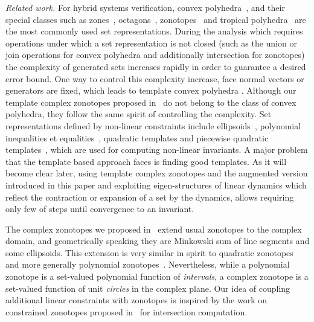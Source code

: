 

\emph{Related work.} For hybrid systems verification, convex polyhedra~\cite{CousotHalbwachs78,jeannet2009apron}, and their special classes such as
zones~\cite{DBLP:conf/pado/Mine01},
octagons~\cite{DBLP:journals/lisp/Mine06}, zonotopes~\cite{DBLP:conf/hybrid/Girard05,DBLP:conf/eucc/MaigaCRT14} and
tropical polyhedra~\cite{DBLP:conf/sas/AllamigeonGG08} are the most
commonly used set representations. During the analysis which requires
operations under which a set representation is not closed (such as the
union or join operations for convex polyhedra and additionally
intersection for zonotopes) the complexity of generated sets increases
rapidly in order to guarantee a desired error bound. One way to
control this complexity increase, face normal vectors or generators
are fixed, which leads to template convex
polyhedra \cite{Sankaranarayanan+Dang+Ivancic-08-Symbolic,DBLP:conf/aplas/DangG11}. Although
our template complex zonotopes proposed in~\cite{tcz2017} do not
belong to the class of convex polyhedra, they follow the same
spirit of controlling the complexity. Set representations defined by non-linear constraints include
ellipsoids~\cite{Kurzhanski2000201}, polynomial
inequalities\cite{DBLP:conf/sas/BagnaraRZ05} et
equalities~\cite{Rodriguez-Carbonell:2007}, quadratic templates and
piecewise quadratic
templates~\cite{DBLP:conf/esop/AdjeGG10,DBLP:conf/hybrid/RouxJGF12,DBLP:conf/fm/RouxG14,DBLP:conf/hybrid/Adje17},
which are used for computing non-linear invariants. A major problem
that the template based approach faces is finding good templates. As
it will become clear later, using template complex zonotopes and the
augmented version introduced in this paper and exploiting
eigen-structures of linear dynamics which reflect the contraction or
expansion of a set by the dynamics, allows requiring only few of steps
until convergence to an invariant.

The complex zonotopes we proposed in~\cite{adimoolamACC2016} extend usual zonotopes to the complex domain, and geometrically speaking they are Minkowski sum of line segments and some ellipsoids. This extension is very similar in spirit to quadratic zonotopes~\cite{DBLP:conf/aplas/AdjeGW15} and more generally polynomial zonotopes~\cite{DBLP:conf/hybrid/Althoff13}. Nevertheless, while a polynomial zonotope is a set-valued polynomial function of \emph{intervals}, a complex zonotope is a set-valued function of unit \emph{circles} in the complex plane. Our idea of coupling additional linear constraints with zonotopes is inspired by the work on constrained zonotopes proposed in~\cite{DBLP:conf/cav/GhorbalGP09} for intersection computation. \\

